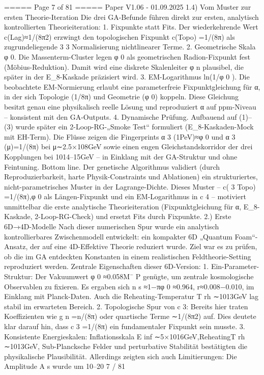 \begin{MyVerbatim}
===== Page 7 of 81 =====
Paper V1.06 - 01.09.2025
1.4) Vom Muster zur ersten Theorie-Iteration
Die drei GA-Befunde führen direkt zur ersten, analytisch kontrollierten Theorieiteration:
1. Fixpunkte statt Fits.
Der wiederkehrende Wert c(Lag)≈1/(8π2) erzwingt den topologischen Fixpunkt c(Topo) =1/(8π) als zugrundeliegende
3 3
Normalisierung nichtlinearer Terme.
2. Geometrische Skala φ 0.
Die Massenterm-Cluster legen φ 0 als geometrischen Radion-Fixpunkt fest (Möbius-Reduktion). Damit wird eine
diskrete Skalenleiter φ n plausibel, die später in der E_8-Kaskade präzisiert wird.
3. EM-Logarithmus ln(1/φ 0 ).
Die beobachtete EM-Normierung erlaubt eine parameterfreie Fixpunktgleichung für α, in der sich Topologie (1/8π)
und Geometrie (φ 0) koppeln. Diese Gleichung besitzt genau eine physikalisch reelle Lösung und reproduziert α auf
ppm-Niveau – konsistent mit den GA-Outputs.
4. Dynamische Prüfung.
Aufbauend auf (1)–(3) wurde später ein 2-Loop-RG-„Smoke Test“ formuliert (E_8-Kaskaden-Mock mit EH-Term). Die
Flüsse zeigen die Fingerprints α 3 (1PeV)≈φ 0 und α 3 (μ)=1/(8π) bei μ∼2.5×108GeV sowie einen engen
Gleichstandskorridor der drei Kopplungen bei 1014–15GeV – in Einklang mit der GA-Struktur und ohne Feintuning.
Bottom line. Der genetische Algorithmus validiert (durch Reproduzierbarkeit, harte Physik-Constraints und
Ablationen) ein strukturiertes, nicht-parametrisches Muster in der Lagrange-Dichte. Dieses Muster –
c( 3 Topo) =1/(8π),φ 0 als Längen-Fixpunkt und ein EM-Logarithmus in c 4 – motiviert unmittelbar die erste analytische
Theorieiteration (Fixpunktgleichung für α, E_8-Kaskade, 2-Loop-RG-Check) und ersetzt Fits durch Fixpunkte.
2.) Erste 6D→4D-Modelle
Nach dieser numerischen Spur wurde ein analytisch kontrollierbares Zwischenmodell entwickelt: ein kompakter 6D
„Quantum Foam“-Ansatz, der auf eine 4D-Effektive Theorie reduziert wurde. Ziel war es zu prüfen, ob die im GA
entdeckten Konstanten in einem realistischen Feldtheorie-Setting reproduziert werden.
Zentrale Eigenschaften dieser 6D-Version:
1. Ein-Parameter-Struktur:
Der Vakuumwert φ 0 ≈0.058M¯ P genügte, um zentrale kosmologische Observablen zu fixieren. Es ergaben sich
n
s
≈1−πφ
0
≈0.964, r≈0.008−0.010,
im Einklang mit Planck-Daten. Auch die Reheating-Temperatur T rh ∼1013GeV lag stabil im erwarteten Bereich.
2. Topologische Spur von c 3:
Bereits hier traten Koeffizienten wie g n =n/(8π) oder quartische Terme ∼1/(8π2) auf. Dies deutete klar darauf hin,
dass c 3 =1/(8π) ein fundamentaler Fixpunkt sein musste.
3. Konsistente Energieskalen:
Inflationsskala E inf ∼5×1016GeV,ReheatingT rh ∼1013GeV, Sub-Plancksche Felder und perturbative Stabilität
bestätigten die physikalische Plausibilität.
Allerdings zeigten sich auch Limitierungen:
Die Amplitude A s wurde um 10–20 %
7 / 81


\end{MyVerbatim}
